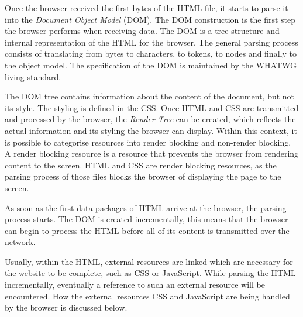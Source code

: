 
Once the browser received the first bytes of the HTML file, it starts to parse it into the \textit{Document Object Model} (DOM).
The DOM construction is the first step the browser performs when receiving data.
The DOM is a tree structure and internal representation of the HTML for the browser. %
The general parsing process consists of translating from bytes to characters, to tokens, to nodes and finally to the object model.%
The specification of the DOM is maintained by the WHATWG living standard. %




The DOM tree contains information about the content of the document, but not its style.
The styling is defined in the CSS.
Once HTML and CSS are transmitted and processed by the browser, the \textit{Render Tree} can be created, which reflects the actual information and its styling the browser can display.
Within this context, it is possible to categorise resources into render blocking and non-render blocking.
A render blocking resource is a resource that prevents the browser from rendering content to the screen.
HTML and CSS are render blocking resources, as the parsing process of those files blocks the browser of displaying the page to the screen.%




As soon as the first data packages of HTML arrive at the browser, the parsing process starts. %
The DOM is created incrementally,  this means that the browser can begin to process the HTML before all of its content is transmitted over the network.



Usually, within the HTML, external resources are linked which are necessary for the website to be complete, such as CSS or JavaScript.
While parsing the HTML incrementally, eventually a reference to such an external resource will be encountered.
How the external resources CSS and JavaScript are being handled by the browser is discussed below.



